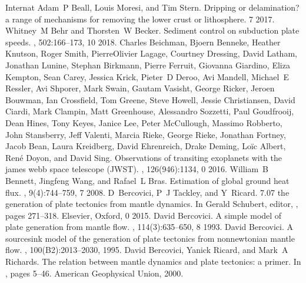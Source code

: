 \documentclass[letterpaper,10pt,english]{jupyterBook}
\begin{document}
\begin{sphinxthebibliography}{Internat}
\sphinxAtStartPar
Adam P Beall, Louis Moresi, and Tim Stern. Dripping or delamination? a range of mechanisms for removing the lower crust or lithosphere. 7 2017.
\sphinxAtStartPar
Whitney M Behr and Thorsten W Becker. Sediment control on subduction plate speeds. , 502:166–173, 10 2018.
\sphinxAtStartPar
Charles Beichman, Bjoern Benneke, Heather Knutson, Roger Smith, Pierre\sphinxhyphen{}Olivier Lagage, Courtney Dressing, David Latham, Jonathan Lunine, Stephan Birkmann, Pierre Ferruit, Giovanna Giardino, Eliza Kempton, Sean Carey, Jessica Krick, Pieter D Deroo, Avi Mandell, Michael E Ressler, Avi Shporer, Mark Swain, Gautam Vasisht, George Ricker, Jeroen Bouwman, Ian Crossfield, Tom Greene, Steve Howell, Jessie Christiansen, David Ciardi, Mark Clampin, Matt Greenhouse, Alessandro Sozzetti, Paul Goudfrooij, Dean Hines, Tony Keyes, Janice Lee, Peter McCullough, Massimo Robberto, John Stansberry, Jeff Valenti, Marcia Rieke, George Rieke, Jonathan Fortney, Jacob Bean, Laura Kreidberg, David Ehrenreich, Drake Deming, Loïc Albert, René Doyon, and David Sing. Observations of transiting exoplanets with the james webb space telescope (JWST). , 126(946):1134, 0 2016.
\sphinxAtStartPar
William B Bennett, Jingfeng Wang, and Rafael L Bras. Estimation of global ground heat flux. , 9(4):744–759, 7 2008.
\sphinxAtStartPar
D Bercovici, P J Tackley, and Y Ricard. 7.07 \sphinxhyphen{} the generation of plate tectonics from mantle dynamics. In Gerald Schubert, editor, , pages 271–318. Elsevier, Oxford, 0 2015.
\sphinxAtStartPar
David Bercovici. A simple model of plate generation from mantle flow. , 114(3):635–650, 8 1993.
\sphinxAtStartPar
David Bercovici. A source\sphinxhyphen{}sink model of the generation of plate tectonics from non\sphinxhyphen{}newtonian mantle flow. , 100(B2):2013–2030, 1995.
\sphinxAtStartPar
David Bercovici, Yanick Ricard, and Mark A Richards. The relation between mantle dynamics and plate tectonics: a primer. In , pages 5–46. American Geophysical Union, 2000.

\end{sphinxthebibliography}
\end{document}
